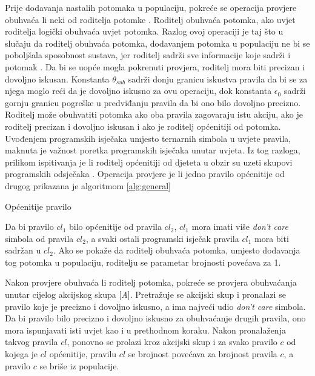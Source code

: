 \documentclass[times, utf8, zavrsni]{fer}
\begin{document}
Prije dodavanja nastalih potomaka u populaciju, pokreće se operacija provjere obuhvaća li neki od roditelja potomke .
Roditelj obuhvaća potomka, ako uvjet roditelja logički obuhvaća uvjet potomka.
Razlog ovoj operaciji je taj što u slučaju da roditelj obuhvaća potomka, dodavanjem potomka u populaciju ne bi se poboljšala sposobnost sustava, jer roditelj sadrži sve informacije koje sadrži i potomak \citep{1}.
Da bi se uopće mogla pokrenuti provjera, roditelj mora biti precizan i dovoljno iskusan.
Konstanta $\theta_{sub}$ sadrži donju granicu iskustva pravila da bi se za njega moglo reći da je dovoljno iskusno za ovu operaciju, dok konstanta $\epsilon_{0}$ sadrži gornju granicu pogreške u predviđanju pravila da bi ono bilo dovoljno precizno.
Roditelj može obuhvatiti potomka ako oba pravila zagovaraju istu akciju, ako je roditelj precizan i dovoljno iskusan i ako je roditelj općenitiji od potomka.
Uvođenjem programskih isječaka umjesto ternarnih simbola u uvjete pravila, maknuta je važnost poretka programskih isječaka unutar uvjeta.
Iz tog razloga, prilikom ispitivanja je li roditelj općenitiji od djeteta u obzir su uzeti skupovi programskih odsječaka \citep{4}.
Operacija provjere je li jedno pravilo općenitije od drugog prikazana je algoritmom \ref{alg:general}
\begin{algorithm}
\caption{Općenitije pravilo}
\label{alg:general}
\begin{algorithmic}
\ENDIF
{}
\ENDIF
{}
\end{algorithmic}
\end{algorithm}
Da bi pravilo $cl_{1}$ bilo općenitije od pravila $cl_{2}$, $cl_{1}$ mora imati više \emph{don't care} simbola od pravila $cl_{2}$, a svaki ostali programski isječak pravila $cl_{1}$ mora biti sadržan u $cl_{2}$.
Ako se pokaže da roditelj obuhvaća potomka, umjesto dodavanja tog potomka u populaciju, roditelju se parametar brojnosti povećava za 1.

Nakon provjere obuhvaća li roditelj potomka, pokreće se provjera obuhvaćanja unutar cijelog akcijskog skupa [\emph{A}].
Pretražuje se akcijski skup i pronalazi se pravilo koje je precizno i dovoljno iskusno, a ima najveći udio \emph{don't care} simbola.
Da bi pravilo bilo precizno i dovoljno iskusno za obuhvaćanje drugih pravila, ono mora ispunjavati isti uvjet kao i u prethodnom koraku.
Nakon pronalaženja takvog pravila $cl$, ponovno se prolazi kroz akcijski skup i za svako pravilo $c$ od kojega je $cl$ općenitije, pravilu $cl$ se brojnost povećava za brojnost pravila $c$, a pravilo $c$ se briše iz populacije.
\end{document}
